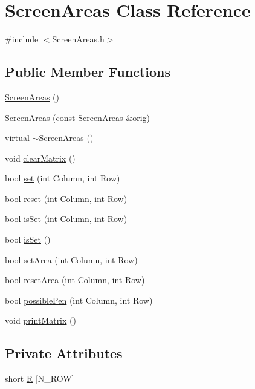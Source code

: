 \hypertarget{classScreenAreas}{
\section{ScreenAreas Class Reference}
\label{classScreenAreas}
}


{\ttfamily \#include $<$ScreenAreas.h$>$}\subsection*{Public Member Functions}
\begin{DoxyCompactItemize}
\item 
\hyperlink{classScreenAreas_aca5c595f504dffec5dd57340978f581e}{ScreenAreas} ()
\item 
\hyperlink{classScreenAreas_adbe7305f6170ebb529f0df7f2fd7359a}{ScreenAreas} (const \hyperlink{classScreenAreas}{ScreenAreas} \&orig)
\item 
virtual \hyperlink{classScreenAreas_aa7631a95539bbe1bffeffa7262e739f6}{$\sim$ScreenAreas} ()
\item 
void \hyperlink{classScreenAreas_a53621c90e26c34a43750eb6fc2c47f2b}{clearMatrix} ()
\item 
bool \hyperlink{classScreenAreas_a585e561af59233e6c0e131fac4c3147e}{set} (int Column, int Row)
\item 
bool \hyperlink{classScreenAreas_aaad2df8786b44cdc919339e276e432fc}{reset} (int Column, int Row)
\item 
bool \hyperlink{classScreenAreas_a444f27e1596fec9e690039c3e713a06d}{isSet} (int Column, int Row)
\item 
bool \hyperlink{classScreenAreas_af4849b1671e82943c581e4195a56d9cf}{isSet} ()
\item 
bool \hyperlink{classScreenAreas_abdef604ad12331d1b7ddfe825df93197}{setArea} (int Column, int Row)
\item 
bool \hyperlink{classScreenAreas_a2e3ae5d88fd9e06bd2f14000af32d387}{resetArea} (int Column, int Row)
\item 
bool \hyperlink{classScreenAreas_a347743e216f48b68b3893744d03747ff}{possiblePen} (int Column, int Row)
\item 
void \hyperlink{classScreenAreas_a2f083ce74c9d0178a84b9bb6c7b0cd69}{printMatrix} ()
\end{DoxyCompactItemize}
\subsection*{Private Attributes}
\begin{DoxyCompactItemize}
\item 
short \hyperlink{classScreenAreas_a29a5e603100adb61d72fcf43cbe75521}{R} \mbox{[}N\_\-ROW\mbox{]}
\end{DoxyCompactItemize}


